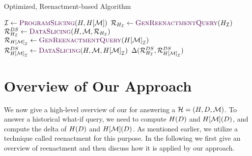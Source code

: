 \begin{algorithm}[t]
  \caption{Optimized, Reenactment-based \abbrHW Algorithm}
  \label{alg:whatif-algo}
  \begin{algorithmic}[1]
    \State $\idxs \gets \Call{ProgramSlicing}{\history,\ahmod}$  \label{alg-line:opt-ps}
    \State $\ract{\hslice{\history}{\idxs}} \gets \Call{GenReenactmentQuery}{\hslice{\history}{\idxs}}$ \label{alg-line:opt-h-renact}
    \State $\ract{\hslice{\history}{\idxs}}^{DS} \gets \Call{DataSlicing}{\history,\deltaHist,\ract{\hslice{\history}{\idxs}}}$ \label{alg-line:opt-h-ds}
    \State $\ract{\hslice{\ahmod}{\idxs}} \gets \Call{GenReenactmentQuery}{\hslice{\ahmod}{\idxs}}$ \label{alg-line:opt-m-renact}
    \State $\ract{\hslice{\ahmod}{\idxs}}^{DS} \gets \Call{DataSlicing}{\history,\deltaHist,\hslice{\ahmod}{\idxs}}$ \label{alg-line:opt-m-ds}
    \State \Return $\Delta(\mathcal{R}_{{H}_{\mathcal{I}}}^{DS},\mathcal{R}_{{H[\mathcal{M}]}_{\mathcal{I}}}^{DS})$ \label{alg-line:opt-diff}
    \EndProcedure
  \end{algorithmic}
\end{algorithm}

\section{Overview of Our Approach}
\label{sec:overview}


We now give a high-level overview of our  for answering a \abbrHW $\mathcal{H} = (H, D, \mathcal{M})$.  %
To answer a historical what-if query, we need to compute $H(D)$ and $H[\mathcal{M}](D)$, and compute the delta of $H(D)$ and $H[\mathcal{M}](D)$. As mentioned earlier, we utilize a technique called reenactment for this purpose. In the following we first give an overview of reenactment and then discuss how it is applied by our approach. %

